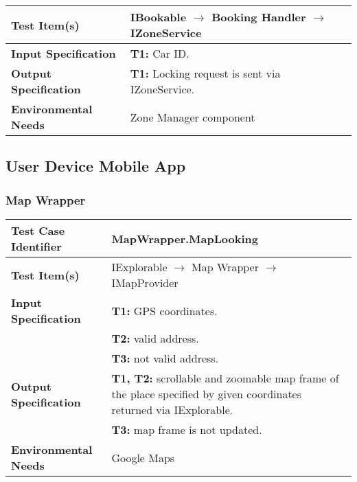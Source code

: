 {\begin{tabularx}{\textwidth}{l X}
    \textbf{Test Item(s)} & IBookable $\rightarrow$ Booking Handler $\rightarrow$ IZoneService\\
    \hline 
    
    \textbf{Input Specification} & \textbf{T1:} Car ID. \\
    \hline 
    
    \textbf{Output Specification} & \textbf{T1:} Locking request is sent via IZoneService.  \\
    \hline 
    
    \textbf{Environmental Needs} & Zone Manager component\\
    \hline
\end{tabularx}




\subsection{User Device Mobile App}

\subsubsection{Map Wrapper}
\noindent
\begin{tabularx}{\textwidth}{l X}
    \hline 
    \textbf{Test Case Identifier} & MapWrapper.MapLooking\\ 
    \hline 
    
    \textbf{Test Item(s)} & IExplorable $\rightarrow$ Map Wrapper $\rightarrow$ IMapProvider\\
    \hline 
    
    \textbf{Input Specification} & \textbf{T1:} GPS coordinates.\\
                                 & \textbf{T2:} valid address.\\
                                 & \textbf{T3:} not valid address.\\
    \hline 
    
    \textbf{Output Specification} & \textbf{T1, T2:} scrollable and zoomable map frame of the place specified by given coordinates returned via IExplorable.\\
                                & \textbf{T3:} map frame is not updated.\\
    \hline 
    
    \textbf{Environmental Needs} & Google Maps\\
    \hline
\end{tabularx}

}
